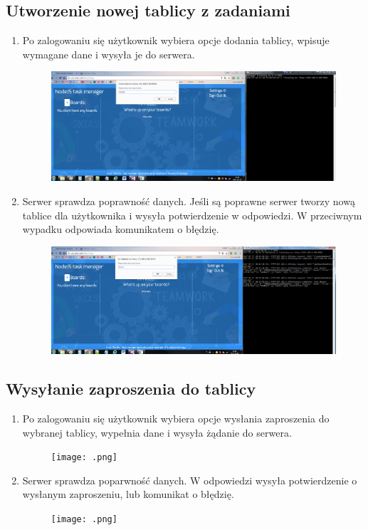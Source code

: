 \documentclass[12pt]{report}
\begin{document}
\begin{enumerate}
\begin{enumerate}
\begin{enumerate}
\subsection{Utworzenie nowej tablicy z zadaniami}
\begin{enumerate}
\item Po zalogowaniu się użytkownik wybiera opcje dodania tablicy, wpisuje wymagane dane i wysyła je do serwera.
\begin{figure}[!t]
\centering
\includegraphics{71.png}
\end{figure}
\item Serwer sprawdza poprawność danych. 
Jeśli są poprawne serwer tworzy nową tablice dla użytkownika i wysyła potwierdzenie w odpowiedzi.
W przeciwnym wypadku odpowiada komunikatem o błędzię.
\begin{figure}[!t]
\centering
\includegraphics{72.png}
\end{figure}
\end{enumerate}

\subsection{Wysyłanie zaproszenia do tablicy}
\begin{enumerate}
\item Po zalogowaniu się użytkownik wybiera opcje wysłania zaproszenia do wybranej tablicy, wypełnia dane i wysyła żądanie do serwera.
\begin{figure}[!t]
\centering
\texttt{[image: .png]}
\end{figure}
\item Serwer sprawdza poparwność danych. 
W odpowiedzi wysyła potwierdzenie o wysłanym zaproszeniu, lub komunikat o błędzię.
\begin{figure}[!t]
\centering
\texttt{[image: .png]}
\end{figure}
\end{enumerate}


\end{enumerate}
\end{enumerate}
\end{enumerate}
\end{document}
